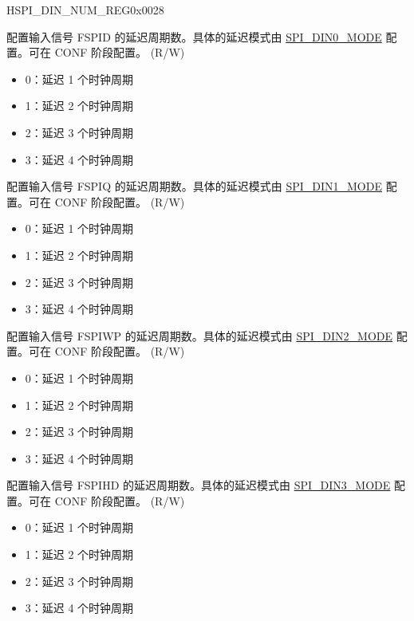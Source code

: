 \begin{register}{H}{SPI\_DIN\_NUM\_REG}{0x0028}\label{regdesc:SPIDINNUMREG}
%
%
%
%
%
\regnewline%
\begin{regdesc}\begin{reglist}
\label{fielddesc:SPIDIN0NUM}\item [SPI\_DIN0\_NUM] 配置输入信号 FSPID 的延迟周期数。具体的延迟模式由 \hyperref[fielddesc:SPIDIN0MODE]{SPI\_DIN0\_MODE} 配置。可在 CONF 阶段配置。 (R/W)
\begin{itemize}
    \item 0：延迟 1 个时钟周期
    \item 1：延迟 2 个时钟周期
    \item 2：延迟 3 个时钟周期
    \item 3：延迟 4 个时钟周期
\end{itemize}
\label{fielddesc:SPIDIN1NUM}\item [SPI\_DIN1\_NUM] 配置输入信号 FSPIQ 的延迟周期数。具体的延迟模式由 \hyperref[fielddesc:SPIDIN1MODE]{SPI\_DIN1\_MODE} 配置。可在 CONF 阶段配置。 (R/W)
\begin{itemize}
    \item 0：延迟 1 个时钟周期
    \item 1：延迟 2 个时钟周期
    \item 2：延迟 3 个时钟周期
    \item 3：延迟 4 个时钟周期
\end{itemize}
\label{fielddesc:SPIDIN2NUM}\item [SPI\_DIN2\_NUM] 配置输入信号 FSPIWP 的延迟周期数。具体的延迟模式由 \hyperref[fielddesc:SPIDIN2MODE]{SPI\_DIN2\_MODE} 配置。可在 CONF 阶段配置。 (R/W)
\begin{itemize}
    \item 0：延迟 1 个时钟周期
    \item 1：延迟 2 个时钟周期
    \item 2：延迟 3 个时钟周期
    \item 3：延迟 4 个时钟周期
\end{itemize}
\label{fielddesc:SPIDIN3NUM}\item [SPI\_DIN3\_NUM] 配置输入信号 FSPIHD 的延迟周期数。具体的延迟模式由 \hyperref[fielddesc:SPIDIN3MODE]{SPI\_DIN3\_MODE} 配置。可在 CONF 阶段配置。 (R/W)
\begin{itemize}
    \item 0：延迟 1 个时钟周期
    \item 1：延迟 2 个时钟周期
    \item 2：延迟 3 个时钟周期
    \item 3：延迟 4 个时钟周期
\end{itemize}
\end{reglist}\end{regdesc}
\end{register}



